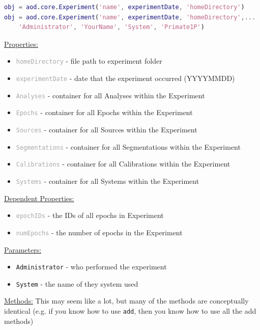 \documentclass[10pt]{exam}
\newcommand\aodparam[1]{\textcolor{codepurple}{\texttt{#1}}}
\newcommand\aodprop[1]{\textcolor{darkgray}{\texttt{#1}}}
\newcommand\aodfcn[1]{\textcolor{darkteal}{\texttt{#1}}}
\newcommand\docheader[1]{\vspace{0.6ex}\noindent\underline{#1}\vspace{0.15ex}}
\begin{document}
		\begin{lstlisting}[language=matlab]
obj = aod.core.Experiment('name', experimentDate, 'homeDirectory')
obj = aod.core.Experiment('name', experimentDate, 'homeDirectory',...
	'Administrator', 'YourName', 'System', 'Primate1P')
		\end{lstlisting}		
		\docheader{Properties:}
		\begin{itemize}
			\item \aodprop{homeDirectory} - file path to experiment folder
			\item \aodprop{experimentDate} - date that the experiment occurred (YYYYMMDD)
			\item \aodprop{Analyses} - container for all Analyses within the Experiment
			\item \aodprop{Epochs} - container for all Epochs within the Experiment
			\item \aodprop{Sources} - container for all Sources within the Experiment
			\item \aodprop{Segmentations} - container for all Segmentations within the Experiment
			\item \aodprop{Calibrations} - container for all Calibrations within the Experiment
			\item \aodprop{Systems} - container for all Systems within the Experiment
		\end{itemize}		
		\docheader{Dependent Properties:}
		\begin{itemize}
			\item \aodprop{epochIDs} - the IDs of all epochs in Experiment
			\item \aodprop{numEpochs} - the number of epochs in the Experiment
		\end{itemize}
		\docheader{Parameters:}
		\begin{itemize}
			\item \aodparam{Administrator} - who performed the experiment
			\item \aodparam{System} - the name of they system used
		\end{itemize}
		\docheader{Methods:} This may seem like a lot, but many of the methods are conceptually identical (e.g. if you know how to use \aodfcn{add}, then you know how to use all the add methods)
\end{document}
